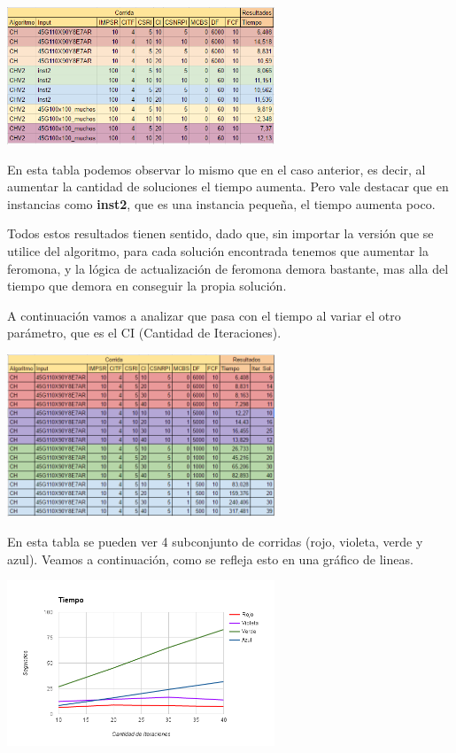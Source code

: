 \begin{center}
\includegraphics[width=0.6\textwidth]{imagenes/tabla2}
\end{center}

En esta tabla podemos observar lo mismo que en el caso anterior, es decir, al aumentar la cantidad de soluciones el tiempo aumenta. Pero vale destacar que en instancias como \textbf{inst2}, que es una instancia pequeña, el tiempo aumenta poco.

Todos estos resultados tienen sentido, dado que, sin importar la versi\'on que se utilice del algoritmo, para cada soluci\'on encontrada tenemos que aumentar la feromona, y la l\'ogica de actualizaci\'on de feromona demora bastante, mas alla del tiempo que demora en conseguir la propia soluci\'on. 

A continuaci\'on vamos a analizar que pasa con el tiempo al variar el otro par\'ametro, que es el CI (Cantidad de Iteraciones). 

\begin{center}
\includegraphics[width=0.6\textwidth]{imagenes/tabla3}
\end{center}

En esta tabla se pueden ver 4 subconjunto de corridas (rojo, violeta, verde y azul). Veamos a continuaci\'on, como se refleja esto en una gr\'afico de lineas.

\begin{center}
\includegraphics[width=0.6\textwidth]{imagenes/grafico1}
\end{center}

